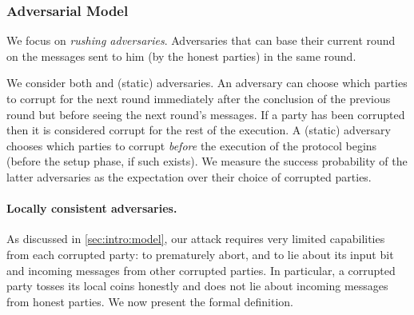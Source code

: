 \subsubsection{Adversarial Model}

We focus on \textit{rushing adversaries}. Adversaries that can base their current round on the messages sent to him (by the honest parties) in the same round.

We consider both \adaptive and \nonadaptive (\aka static) adversaries. An \adaptive adversary can choose which parties to corrupt for the next round immediately after the conclusion of the previous round but before seeing the next round's messages. If a party has been corrupted then it is considered corrupt for the rest of the execution. A \nonadaptive (static) adversary chooses which parties to corrupt \emph{before} the execution of the protocol begins (\ie before the setup phase, if such exists). We measure the success probability of the latter adversaries
as the expectation over their choice of corrupted parties.

\paragraph{Locally consistent adversaries.}
As discussed in \cref{sec:intro:model}, our attack requires very limited capabilities from each corrupted party: to prematurely abort, and to lie about its input bit and incoming messages from other corrupted parties. In particular, a corrupted party tosses its local coins honestly and does not lie about incoming messages from honest parties. We now present the formal definition.

